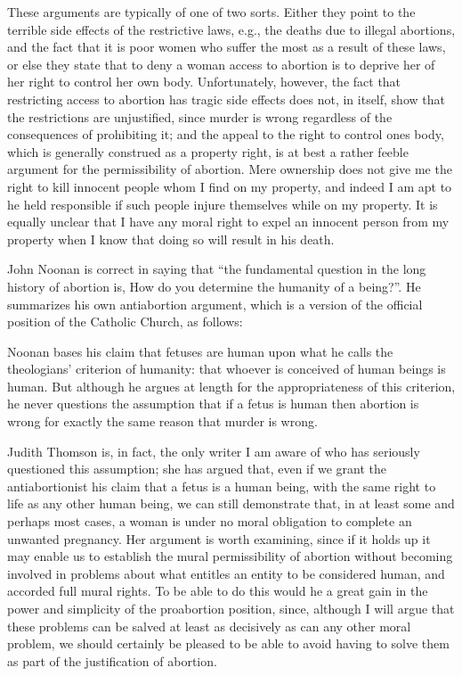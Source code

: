These arguments are typically of one of two sorts. Either
they point to the terrible side effects of the restrictive
laws, e.g., the deaths due to illegal abortions, and the fact
that it is poor women who suffer the most as a result of
these laws, or else they state that to deny a woman access
to abortion is to deprive her of her right to control her
own body. Unfortunately, however, the fact that
restricting access to abortion has tragic side effects does
not, in itself, show that the restrictions are unjustified,
since murder is wrong regardless of the consequences of
prohibiting it; and the appeal to the right to control ones
body, which is generally construed as a property right, is
at best a rather feeble argument for the permissibility of
abortion. Mere ownership does not give me the right to
kill innocent people whom I find on my property, and
indeed I am apt to he held responsible if such people
injure themselves while on my property. It is equally
unclear that I have any moral right to expel an innocent
person from my property when I know that doing so will
result in his death.

John Noonan is correct in saying that “the fundamental
question in the long history of abortion is, How do you
determine the humanity of a being?”. \autocite{Noonan1} He summarizes his
own antiabortion argument, which is a version of the
official position of the Catholic Church, as follows:\autocite{Noonan2}

Noonan bases his claim that fetuses are human upon what
he calls the theologians’ criterion of humanity: that
whoever is conceived of human beings is human. But
although he argues at length for the appropriateness of
this criterion, he never questions the assumption that if a
fetus is human then abortion is wrong for exactly the
same reason that murder is wrong.

Judith Thomson is, in fact, the only writer I am aware of
who has seriously questioned this assumption; she has
argued that, even if we grant the antiabortionist his claim
that a fetus is a human being, with the same right to life as
any other human being, we can still demonstrate that, in at
least some and perhaps most cases, a woman is under no
moral obligation to complete an unwanted pregnancy.\autocite{Thomson1}
Her argument is worth examining, since if it holds up it
may enable us to establish the mural permissibility of
abortion without becoming involved in problems about
what entitles an entity to be considered human, and
accorded full mural rights. To be able to do this would he
a great gain in the power and simplicity of the proabortion
position, since, although I will argue that these problems
can be salved at least as decisively as can any other moral
problem, we should certainly be pleased to be able to
avoid having to solve them as part of the justification of
abortion. 

